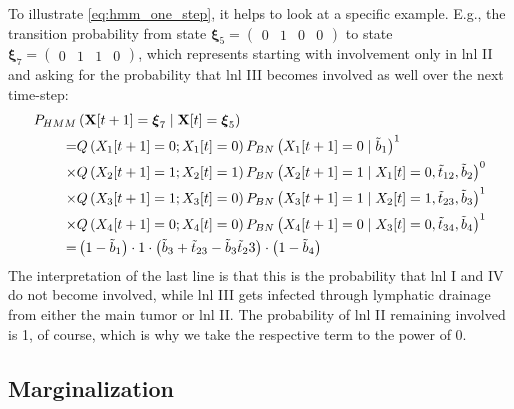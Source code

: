 \documentclass[../ms.tex]{subfiles}
\begin{document}
To illustrate \cref{eq:hmm_one_step}, it helps to look at a specific example. E.g., the transition probability from state $\boldsymbol{\xi}_5 = \begin{pmatrix} 0 & 1 & 0 & 0 \end{pmatrix}$ to state $\boldsymbol{\xi}_7 = \begin{pmatrix} 0 & 1 & 1 & 0 \end{pmatrix}$, which represents starting with involvement only in \gls{lnl} II and asking for the probability that \gls{lnl} III becomes involved as well over the next time-step:
%
\begin{equation}
    \begin{aligned}
        P_{HMM} &\left( \mathbf{X}[t+1] = \boldsymbol{\xi}_7 \mid \mathbf{X}[t] = \boldsymbol{\xi}_5 \right) \\
        = &Q \left( X_1[t+1] = 0; X_1[t] = 0 \right) P_{BN} \left( X_1[t+1] = 0 \mid \Tilde{b}_1 \right)^1 \\
        \times &Q \left( X_2[t+1] = 1; X_2[t] = 1 \right) P_{BN} \left( X_2[t+1] = 1 \mid X_1[t] = 0, \Tilde{t}_{12}, \Tilde{b}_2 \right)^0 \\
        \times &Q \left( X_3[t+1] = 1; X_3[t] = 0 \right) P_{BN} \left( X_3[t+1] = 1 \mid X_2[t] = 1, \Tilde{t}_{23}, \Tilde{b}_3 \right)^1 \\
        \times &Q \left( X_4[t+1] = 0; X_4[t] = 0 \right) P_{BN} \left( X_4[t+1] = 0 \mid X_3[t] = 0, \Tilde{t}_{34}, \Tilde{b}_4 \right)^1 \\
        = &\left( 1 - \Tilde{b}_1 \right) \cdot 1 \cdot \left( \Tilde{b}_3 + \Tilde{t}_{23} - \Tilde{b}_3 \Tilde{t}_23 \right) \cdot \left( 1 - \Tilde{b}_4 \right)
    \end{aligned}
\end{equation}
%
The interpretation of the last line is that this is the probability that \gls{lnl} I and IV do not become involved, while \gls{lnl} III gets infected through lymphatic drainage from either the main tumor or \gls{lnl} II. The probability of \gls{lnl} II remaining involved is 1, of course, which is why we take the respective term to the power of 0.

\subsection{Marginalization}
\label{subsec:hmm_marginalization}
\end{document}
